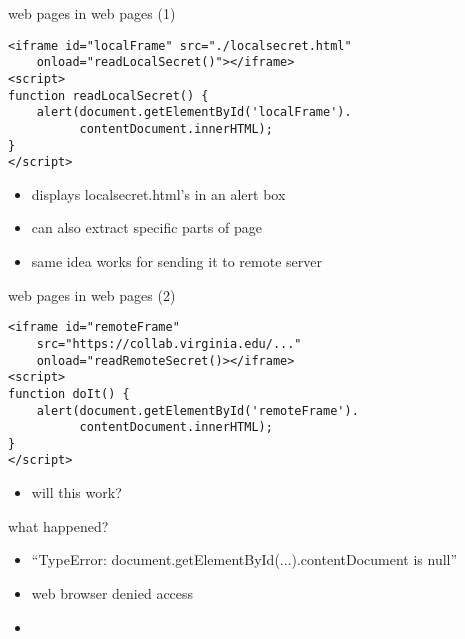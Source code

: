 
\begin{frame}[fragile,label=webInWeb]{web pages in web pages (1)}
    \vspace{-.25cm}
\begin{verbatim}
<iframe id="localFrame" src="./localsecret.html"
    onload="readLocalSecret()"></iframe>
<script>
function readLocalSecret() {
    alert(document.getElementById('localFrame').
          contentDocument.innerHTML);
}
</script>
\end{verbatim}
    \begin{itemize}
    \vspace{-.25cm}
    \item displays localsecret.html's  in an alert box
    \item can also extract specific parts of page
    \item same idea works for sending it to remote server
    \end{itemize}
\end{frame}

\begin{frame}[fragile,label=webInWebOther]{web pages in web pages (2)}
    \vspace{-.25cm}
    \setlength{\parskip}{-0.5\baselineskip}
\begin{verbatim}
<iframe id="remoteFrame"
    src="https://collab.virginia.edu/..."
    onload="readRemoteSecret()></iframe>
<script>
function doIt() {
    alert(document.getElementById('remoteFrame').
          contentDocument.innerHTML);
}
</script>
\end{verbatim}
    \begin{itemize}
    \vspace{-.25cm}
    \item will this work?
    \end{itemize}
\end{frame}

\begin{frame}{what happened?}
    \begin{itemize}
        \item ``TypeError: document.getElementById(...).contentDocument is null''
        \item web browser denied access
        \vspace{.5cm}
    \item {}
    \end{itemize}
\end{frame}


